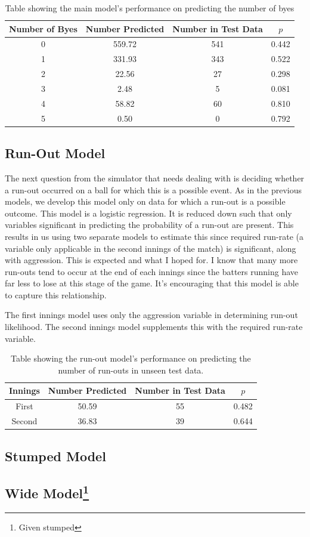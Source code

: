 \begin{table}[h]
\vspace{0.5em}
\centering
\begin{tabular} {c c c c} \toprule
    {Number of Byes} & {Number Predicted} & {Number in Test Data} & {$p$} \\ \midrule
     0 & 559.72 & 541 & 0.442 \\
     1 & 331.93 & 343 & 0.522 \\
     2 & 22.56 & 27 & 0.298 \\
     3 & 2.48 & 5 & 0.081 \\
     4 & 58.82 & 60 & 0.810 \\
     5 & 0.50 & 0 & 0.792 \\ \bottomrule
\end{tabular}
\caption{Table showing the main model's performance on predicting the number of byes }
\label{table: byes}
\end{table}

\subsection{Run-Out Model}

The next question from the simulator that needs dealing with is deciding whether a run-out occurred on a ball for which this is a possible event. As in the previous models, we develop this model only on data for which a run-out is a possible outcome. This model is a logistic regression. It is reduced down such that only variables significant in predicting the probability of a run-out are present. This results in us using two separate models to estimate this since required run-rate (a variable only applicable in the second innings of the match) is significant, along with aggression. This is expected and what I hoped for. I know that many more run-outs tend to occur at the end of each innings since the batters running have far less to lose at this stage of the game. It's encouraging that this model is able to capture this relationship.

The first innings model uses only the aggression variable in determining run-out likelihood. The second innings model supplements this with the required run-rate variable.

\begin{table}[ht]
\vspace{0.5em}
\centering
\begin{tabular} {c c c c} \toprule
    {Innings} & {Number Predicted} & {Number in Test Data} & {$p$} \\ \midrule
     First & 50.59 & 55 & 0.482 \\
     Second & 36.83 & 39 & 0.644 \\ \bottomrule
\end{tabular}
\caption{Table showing the run-out model's performance on predicting the number of run-outs in unseen test data.}
\label{table: runouts}
\end{table}

\subsection{Stumped Model}

\subsection[Wide Model]{Wide Model\footnote{Given stumped}}


